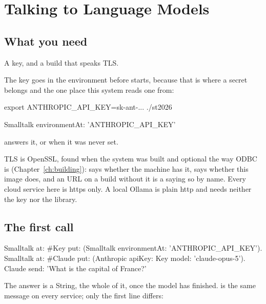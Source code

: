 \chapter{Talking to Language Models}
\label{ch:llm}


\section{What you need}

A key, and a build that speaks TLS.

The key goes in the environment before  starts, because that is
where a secret belongs and the one place this system reads one from:

\begin{sh}
export ANTHROPIC_API_KEY=sk-ant-...
./st2026
\end{sh}

\begin{st}
Smalltalk environmentAt: 'ANTHROPIC_API_KEY'
\end{st}

answers it, or  when it was never set.

TLS is OpenSSL, found when the system was built and optional the way ODBC
is (Chapter~\ref{ch:building}):  says whether the machine has
it,  says whether this image does, and an
 URL on a build without it is a  saying so by name.
Every cloud service here is https only. A local Ollama is plain http and
needs neither the key nor the library.

\section{The first call}

\begin{st}
Smalltalk at: #Key put: (Smalltalk environmentAt: 'ANTHROPIC_API_KEY').
Smalltalk at: #Claude put: (Anthropic apiKey: Key model: 'claude-opus-5').
Claude send: 'What is the capital of France?'
\end{st}

The answer is a String, the whole of it, once the model has finished.
 is the same message on every service; only the first line
differs:

